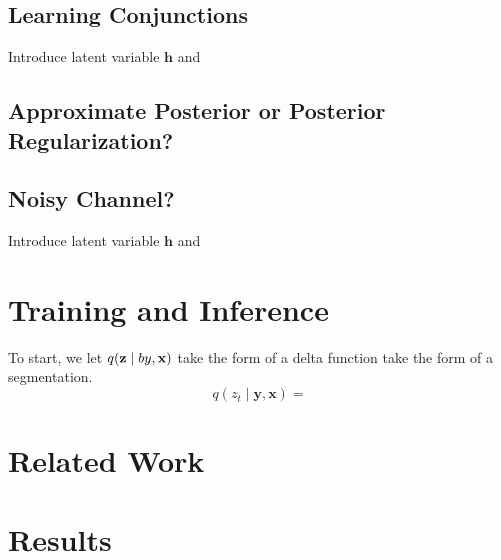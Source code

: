 \documentclass{article}
\newcommand{\bh}{\mathbf{h}}
\newcommand{\bx}{\mathbf{x}}
\newcommand{\by}{\mathbf{y}}
\newcommand{\bz}{\mathbf{z}}
\begin{document}
\subsection{Learning Conjunctions}
Introduce latent variable $\bh$ and 

\subsection{Approximate Posterior or Posterior Regularization?}

\subsection{Noisy Channel?}
Introduce latent variable $\bh$ and 

\section{Training and Inference}
To start, we let $q(\bz\mid\\by,\bx)$ take the form of a
delta function take the form of a segmentation.
$$q(z_t\mid\by,\bx)=$$

\section{Related Work}

\section{Results}



\end{document}
